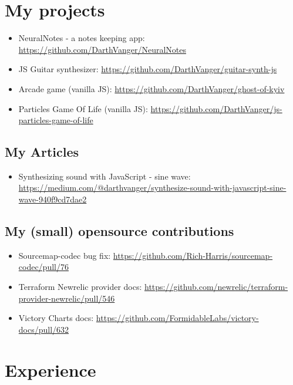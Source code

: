 \documentclass[a4paper, 14pt]{article}
\begin{document}
\section{My projects}
  \begin{itemize}
    \item NeuralNotes - a notes keeping app: \url{https://github.com/DarthVanger/NeuralNotes} \\
    \item JS Guitar synthesizer: \url{https://github.com/DarthVanger/guitar-synth-js} \\
    \item Arcade game (vanilla JS): \url{https://github.com/DarthVanger/ghost-of-kyiv} \\
    \item Particles Game Of Life (vanilla JS): \url{https://github.com/DarthVanger/js-particles-game-of-life}
  \end{itemize}

  \subsection{My Articles}
    \begin{itemize}
      \item Synthesizing sound with JavaScript - sine wave: \url{https://medium.com/@darthvanger/synthesize-sound-with-javascript-sine-wave-940f9cd7dae2}
    \end{itemize}

  \subsection{My (small) opensource contributions}
    \begin{itemize}
      \item Sourcemap-codec bug fix: \url{https://github.com/Rich-Harris/sourcemap-codec/pull/76} \\
      \item Terraform Newrelic provider docs: \url{https://github.com/newrelic/terraform-provider-newrelic/pull/546} \\
      \item Victory Charts docs: \url{https://github.com/FormidableLabs/victory-docs/pull/632}
    \end{itemize}

\section{Experience}
\end{document}
